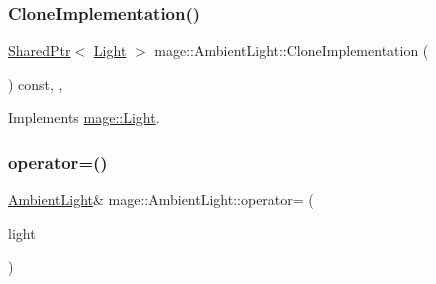 \hypertarget{classmage_1_1_ambient_light_a7f9f9a487416b0a9dce8aee226275512}{}\label{classmage_1_1_ambient_light_a7f9f9a487416b0a9dce8aee226275512} 
\subsubsection{\texorpdfstring{Clone\+Implementation()}{CloneImplementation()}}
{\footnotesize\ttfamily \hyperlink{namespacemage_a1e01ae66713838a7a67d30e44c67703e}{Shared\+Ptr}$<$ \hyperlink{classmage_1_1_light}{Light} $>$ mage\+::\+Ambient\+Light\+::\+Clone\+Implementation (\begin{DoxyParamCaption}{ }\end{DoxyParamCaption}) const\hspace{0.3cm}{\ttfamily [override]}, {\ttfamily [private]}, {\ttfamily [virtual]}}



Implements \hyperlink{classmage_1_1_light_a53ef28bad86a1a307db90cb265db4798}{mage\+::\+Light}.

\hypertarget{classmage_1_1_ambient_light_a9f7eb6bf5d67d4e38fd59ed24837ce4d}{}\label{classmage_1_1_ambient_light_a9f7eb6bf5d67d4e38fd59ed24837ce4d} 
\subsubsection{\texorpdfstring{operator=()}{operator=()}\hspace{0.1cm}{\footnotesize\ttfamily [1/2]}}
{\footnotesize\ttfamily \hyperlink{classmage_1_1_ambient_light}{Ambient\+Light}\& mage\+::\+Ambient\+Light\+::operator= (\begin{DoxyParamCaption}\item[{const \hyperlink{classmage_1_1_ambient_light}{Ambient\+Light} \&}]{light }\end{DoxyParamCaption})\hspace{0.3cm}{\ttfamily [delete]}}

\hypertarget{classmage_1_1_ambient_light_a5afea0b13343c62e9e2c099d444d0dd2}{}\label{classmage_1_1_ambient_light_a5afea0b13343c62e9e2c099d444d0dd2} 
